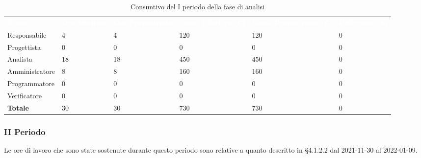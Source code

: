 \begin{table}[!htbp]
\begin{center}
\renewcommand{\arraystretch}{1.5}
\begin{tabular}{ m{}<{\centering}  m{}<{\centering} m{}<{\centering} m{}<{\centering} m{}<{\centering} m{}<{\centering}}
	\rowcolor{darkblue}
	\textcolor{white}{\textbf{Ruolo}} & \textcolor{white}{\textbf{Ore Effettive}} & \textcolor{white}{\textbf{Ore Preventivate}}&\textcolor{white}{\textbf{Costo Effettivo (\euro) }}&\textcolor{white}{\textbf{Costo Preventivato (\euro)}}&\textcolor{white}{\textbf{Differenza (\euro)}}\\ 

	Responsabile  & 4 & 4 & 120 & 120 & 0\\	
	
	Progettista & 0 & 0 & 0 & 0 & 0\\
	
	Analista & 18 & 18 & 450 & 450 & 0\\
	
	Amministratore & 8 & 8 & 160 & 160 & 0\\
	
	Programmatore & 0 & 0 &0 &0 & 0\\
	
	Verificatore & 0 & 0 & 0 & 0 & 0\\
	
	\textbf{Totale} & 30 & 30 & 730 & 730 & 0\\
	
\end{tabular}
\caption{Consuntivo del I periodo della fase di analisi}
\end{center}
\end{table}


\subsubsection{II Periodo}
Le ore di lavoro che sono state sostenute durante questo periodo sono relative a quanto descritto in §4.1.2.2 dal 2021-11-30 al 2022-01-09.

